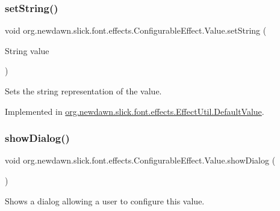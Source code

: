 \subsubsection{\texorpdfstring{set\+String()}{setString()}}
{\footnotesize\ttfamily void org.\+newdawn.\+slick.\+font.\+effects.\+Configurable\+Effect.\+Value.\+set\+String (\begin{DoxyParamCaption}\item[{String}]{value }\end{DoxyParamCaption})}

Sets the string representation of the value. 

Implemented in \mbox{\hyperlink{classorg_1_1newdawn_1_1slick_1_1font_1_1effects_1_1_effect_util_1_1_default_value_af466ff9656f4b53ef10d130ba0b366a1}{org.\+newdawn.\+slick.\+font.\+effects.\+Effect\+Util.\+Default\+Value}}.

\mbox{\label{interfaceorg_1_1newdawn_1_1slick_1_1font_1_1effects_1_1_configurable_effect_1_1_value_af72521e4470795830ee1fa887b4587fa}} 
\subsubsection{\texorpdfstring{show\+Dialog()}{showDialog()}}
{\footnotesize\ttfamily void org.\+newdawn.\+slick.\+font.\+effects.\+Configurable\+Effect.\+Value.\+show\+Dialog (\begin{DoxyParamCaption}{ }\end{DoxyParamCaption})}

Shows a dialog allowing a user to configure this value. 